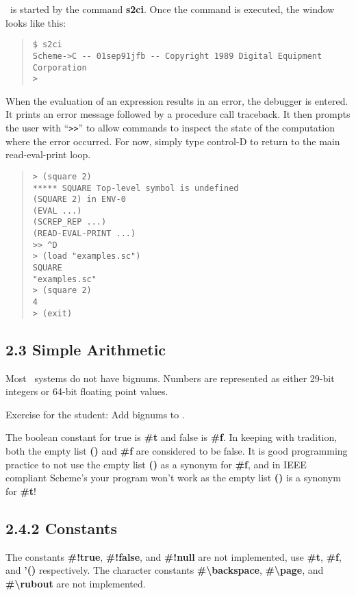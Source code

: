 \documentclass[10pt]{article}
\begin{document}
\StoC\ is started by the command \textbf{s2ci}.  Once the command
is executed, the window looks like this:

\begin{quote}
\begin{verbatim}
$ s2ci
Scheme->C -- 01sep91jfb -- Copyright 1989 Digital Equipment Corporation
>
\end{verbatim}
\end{quote}

When the evaluation of an expression results in an error, the
debugger is entered.  It prints an error message followed by a
procedure call traceback.  It then prompts the user with ``\texttt{>>}''
to allow commands to inspect the state of the computation
where the error occurred.  For now, simply type control-D to
return to the main read-eval-print loop.
\begin{quote}
\begin{verbatim}
> (square 2)
***** SQUARE Top-level symbol is undefined
(SQUARE 2) in ENV-0
(EVAL ...)
(SCREP_REP ...)
(READ-EVAL-PRINT ...)
>> ^D
> (load "examples.sc")
SQUARE
"examples.sc"
> (square 2)
4
> (exit)
\end{verbatim}
\end{quote}

\subsection*{2.3 Simple Arithmetic}

Most \StoC\ systems do not have bignums.  Numbers are
represented as either 29-bit integers or 64-bit floating point
values.

Exercise for the student:  Add bignums to \StoC.

The boolean constant for true is \textbf{\#t} and false is \textbf{\#f}.
In keeping with tradition, both the empty list \textbf{()} and \textbf{\#f}
are considered to be false.  It is good programming practice
to not use the empty list \textbf{()} as a synonym for \textbf{\#f}, and in
IEEE compliant Scheme's your program won't work as the empty
list \textbf{()} is a synonym for \textbf{\#t}!

\subsection*{2.4.2 Constants}

The constants \textbf{\#!true}, \textbf{\#!false}, and \textbf{\#!null} are not implemented,
use \textbf{\#t}, \textbf{\#f}, and \textbf{'()} respectively. The character
constants \textbf{\#\textbackslash{}backspace}, \textbf{\#\textbackslash{}page}, and \textbf{\#\textbackslash{}rubout} are not
implemented.
\end{document}
